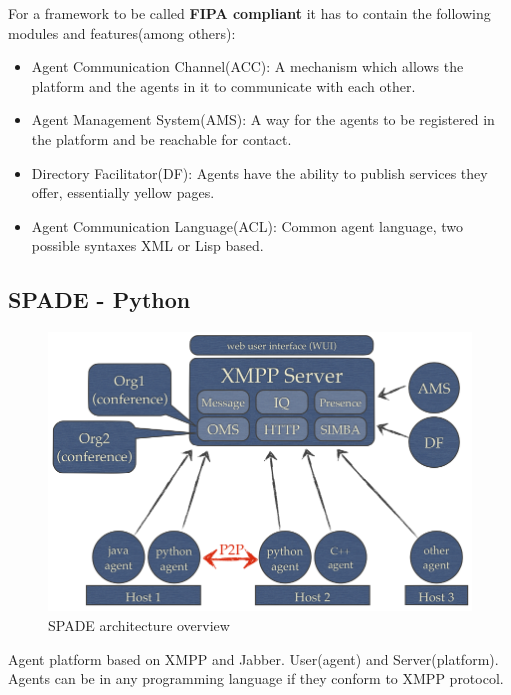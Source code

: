 \documentclass[a4paper, 11pt]{article}
\begin{document}
\noindent For a framework to be called \textbf{FIPA compliant} it has to contain the following modules and features(among others): 
\begin{itemize}
	\item Agent Communication Channel(ACC): A mechanism which allows the platform and the agents in it to communicate with each other.
	\item Agent Management System(AMS): A way for the agents to be registered in the platform and be reachable for contact.
	\item Directory Facilitator(DF): Agents have the ability to publish services they offer, essentially yellow pages.
	\item Agent Communication Language(ACL): Common agent language, two possible syntaxes XML or Lisp based.
\end{itemize}

\subsection{SPADE - Python}

\begin{figure}[H]
	\caption{SPADE architecture overview}
	\centering
	\includegraphics[scale=0.7]{./images/spade_overview.png}
\end{figure}

Agent platform based on XMPP and Jabber. User(agent) and Server(platform). Agents can be in any programming language if they conform to XMPP protocol.
\end{document}
